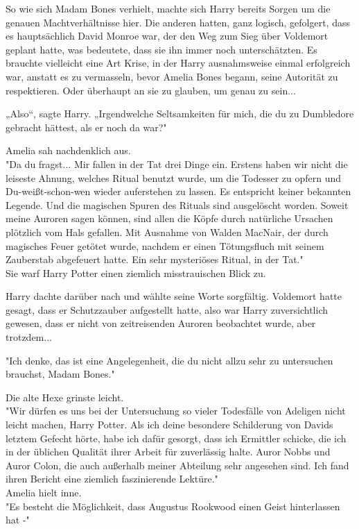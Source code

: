 {So wie sich Madam Bones verhielt, machte sich Harry bereits Sorgen um die genauen Machtverhältnisse hier. Die anderen hatten, ganz logisch, gefolgert, dass es hauptsächlich David Monroe war, der den Weg zum Sieg über Voldemort geplant hatte, was bedeutete, dass sie ihn immer noch unterschätzten. Es brauchte vielleicht eine Art Krise, in der Harry ausnahmsweise einmal erfolgreich war, anstatt es zu vermasseln, bevor Amelia Bones begann, seine Autorität zu respektieren. Oder überhaupt an sie zu glauben, um genau zu sein...

„Also“, sagte Harry. „Irgendwelche Seltsamkeiten für mich, die du zu Dumbledore gebracht hättest, als er noch da war?"

Amelia sah nachdenklich aus.\\ "Da du fragst... Mir fallen in der Tat drei Dinge ein. Erstens haben wir nicht die leiseste Ahnung, welches Ritual benutzt wurde, um die Todesser zu opfern und Du-weißt-schon-wen wieder auferstehen zu lassen. Es entspricht keiner bekannten Legende. Und die magischen Spuren des Rituals sind ausgelöscht worden. Soweit meine Auroren sagen können, sind allen die Köpfe durch natürliche Ursachen plötzlich vom Hals gefallen. Mit Ausnahme von Walden MacNair, der durch magisches Feuer getötet wurde, nachdem er einen Tötungsfluch mit seinem Zauberstab abgefeuert hatte. Ein sehr mysteriöses Ritual, in der Tat."\\ Sie warf Harry Potter einen ziemlich misstrauischen Blick zu.

Harry dachte darüber nach und wählte seine Worte sorgfältig. Voldemort hatte gesagt, dass er Schutzzauber aufgestellt hatte, also war Harry zuversichtlich gewesen, dass er nicht von zeitreisenden Auroren beobachtet wurde, aber trotzdem...

"Ich denke, das ist eine Angelegenheit, die du nicht allzu sehr zu untersuchen brauchst, Madam Bones."

Die alte Hexe grinste leicht.\\ "Wir dürfen es uns bei der Untersuchung so vieler Todesfälle von Adeligen nicht leicht machen, Harry Potter. Als ich deine besondere Schilderung von Davids letztem Gefecht hörte, habe ich dafür gesorgt, dass ich Ermittler schicke, die ich in der üblichen Qualität ihrer Arbeit für zuverlässig halte. Auror Nobbs und Auror Colon, die auch außerhalb meiner Abteilung sehr angesehen sind. Ich fand ihren Bericht eine ziemlich faszinierende Lektüre."\\ Amelia hielt inne.\\ "Es besteht die Möglichkeit, dass Augustus Rookwood einen Geist hinterlassen hat -"

}
